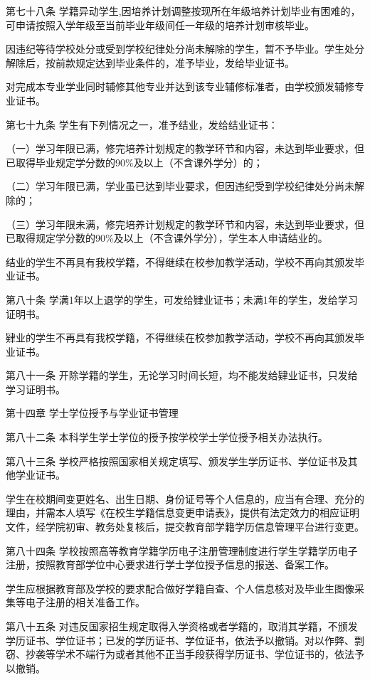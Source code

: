 \documentclass[UTF8,12pt,a4paper]{report}
\begin{document}
第七十八条  学籍异动学生,因培养计划调整按现所在年级培养计划毕业有困难的，可申请按照入学年级至当前毕业年级间任一年级的培养计划审核毕业。

因违纪等待学校处分或受到学校纪律处分尚未解除的学生，暂不予毕业。学生处分解除后，按前款规定达到毕业条件的，准予毕业，发给毕业证书。

对完成本专业学业同时辅修其他专业并达到该专业辅修标准者，由学校颁发辅修专业证书。

第七十九条  学生有下列情况之一，准予结业，发给结业证书：

（一）学习年限已满，修完培养计划规定的教学环节和内容，未达到毕业要求，但已取得毕业规定学分数的90\%及以上（不含课外学分）的；

（二）学习年限已满，学业虽已达到毕业要求，但因违纪受到学校纪律处分尚未解除的；

（三）学习年限未满，修完培养计划规定的教学环节和内容，未达到毕业要求，但已取得规定学分数的90\%及以上（不含课外学分），学生本人申请结业的。

结业的学生不再具有我校学籍，不得继续在校参加教学活动，学校不再向其颁发毕业证书。

第八十条  学满1年以上退学的学生，可发给肄业证书；未满1年的学生，发给学习证明书。

肄业的学生不再具有我校学籍，不得继续在校参加教学活动，学校不再向其颁发毕业证书。

第八十一条  开除学籍的学生，无论学习时间长短，均不能发给肄业证书，只发给学习证明书。



第十四章  学士学位授予与学业证书管理

第八十二条  本科学生学士学位的授予按学校学士学位授予相关办法执行。

第八十三条  学校严格按照国家相关规定填写、颁发学生学历证书、学位证书及其他学业证书。

学生在校期间变更姓名、出生日期、身份证号等个人信息的，应当有合理、充分的理由，并需本人填写《在校生学籍信息变更申请表》，提供有法定效力的相应证明文件，经学院初审、教务处复核后，提交教育部学籍学历信息管理平台进行变更。

第八十四条  学校按照高等教育学籍学历电子注册管理制度进行学生学籍学历电子注册，按照教育部学位中心要求进行学士学位授予信息的报送、备案工作。

学生应根据教育部及学校的要求配合做好学籍自查、个人信息核对及毕业生图像采集等电子注册的相关准备工作。

第八十五条  对违反国家招生规定取得入学资格或者学籍的，取消其学籍，不颁发学历证书、学位证书；已发的学历证书、学位证书，依法予以撤销。对以作弊、剽窃、抄袭等学术不端行为或者其他不正当手段获得学历证书、学位证书的，依法予以撤销。
\end{document}
